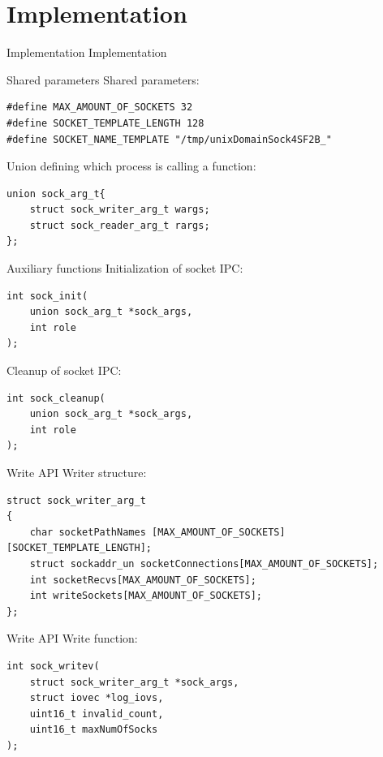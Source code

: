 \documentclass[11pt,english,table,dvipsnames]{beamer}
\begin{document}
\section{Implementation}
\begin{frame}{Implementation}
    Implementation
\end{frame}

\begin{frame}[fragile]{Shared parameters}
    \vfill
    Shared parameters\@:
    \vfill
    \begin{lstlisting}
#define MAX_AMOUNT_OF_SOCKETS 32
#define SOCKET_TEMPLATE_LENGTH 128
#define SOCKET_NAME_TEMPLATE "/tmp/unixDomainSock4SF2B_"
    \end{lstlisting}

    \vfill
    Union defining which process is calling a function\@:
    \vfill
    \begin{lstlisting}
union sock_arg_t{
    struct sock_writer_arg_t wargs;
    struct sock_reader_arg_t rargs;
};
    \end{lstlisting}
\end{frame}

\begin{frame}[fragile]{Auxiliary functions}
    \vfill
    Initialization of socket IPC\@:
    \vfill
    \begin{lstlisting}
int sock_init(
    union sock_arg_t *sock_args,
    int role
);
    \end{lstlisting}

    \vfill
    Cleanup of socket IPC\@:
    \vfill
    \begin{lstlisting}
int sock_cleanup(
    union sock_arg_t *sock_args,
    int role
);
    \end{lstlisting}
\end{frame}

\begin{frame}[fragile]{Write API}
    \vfill
    Writer structure\@:
    \vfill
    \begin{lstlisting}[breaklines]
struct sock_writer_arg_t
{
    char socketPathNames [MAX_AMOUNT_OF_SOCKETS][SOCKET_TEMPLATE_LENGTH];
    struct sockaddr_un socketConnections[MAX_AMOUNT_OF_SOCKETS];
    int socketRecvs[MAX_AMOUNT_OF_SOCKETS];
    int writeSockets[MAX_AMOUNT_OF_SOCKETS];
};
    \end{lstlisting}
\end{frame}

\begin{frame}[fragile]{Write API}
    \vfill
    Write function\@:
    \vfill
    \begin{lstlisting}
int sock_writev(
    struct sock_writer_arg_t *sock_args,
    struct iovec *log_iovs,
    uint16_t invalid_count,
    uint16_t maxNumOfSocks
);
    \end{lstlisting}
\end{frame}
\end{document}
